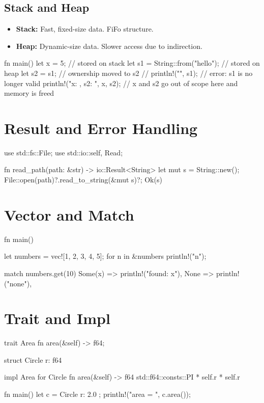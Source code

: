 \documentclass[8pt,a4paper,twocolumn]{extarticle}
\begin{document}
\subsection{Stack and Heap}
\begin{itemize}
  \item \textbf{Stack:} Fast, fixed-size data. FiFo structure.
  \item \textbf{Heap:} Dynamic-size data. Slower access due to indirection.
\end{itemize}
\begin{Code}
fn main() {
    let x = 5;              // stored on stack
    let s1 = String::from("hello"); // stored on heap
    let s2 = s1;           // ownership moved to s2
    // println!("{}", s1);  // error: s1 is no longer valid
    println!("x: {}, s2: {}", x, s2);
} // x and s2 go out of scope here and memory is freed

\section{Result and Error Handling}
\begin{Code}
use std::fs::File;
use std::io::{self, Read};

fn read_path(path: &str) -> io::Result<String> {
    let mut s = String::new();
    File::open(path)?.read_to_string(&mut s)?;
    Ok(s)
}
\end{Code}

\section{Vector and Match}
\begin{Code}
fn main() {
    let numbers = vec![1, 2, 3, 4, 5];
    for n in &numbers { println!("{n}"); }

    match numbers.get(10) {
        Some(x) => println!("found: {x}"),
        None => println!("none"),
    }
}
\end{Code}

\section{Trait and Impl}
\begin{Code}
trait Area { fn area(&self) -> f64; }

struct Circle { r: f64 }

impl Area for Circle {
    fn area(&self) -> f64 { std::f64::consts::PI * self.r * self.r }
}

fn main() {
    let c = Circle { r: 2.0 };
    println!("area = {}", c.area());
}
\end{Code}



\end{Code}
\end{document}

